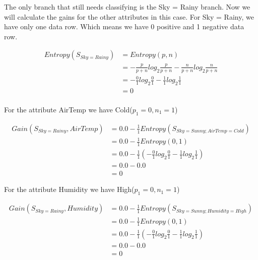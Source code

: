 \documentclass[10pt,a4paper]{article}
\begin{document}
{{{{{{{{{{

The only branch that still needs classifying is the Sky = Rainy branch. Now we will calculate the gains for the other attributes in this case. For Sky = Rainy, we have only one data row. Which means we have 0 positive and 1 negative data row.

\begin{equation}
\begin{split}
Entropy(S_{Sky=Rainy}) &= Entropy(p,n) \\
                       &= -\frac{p}{p+n}log_2\frac{p}{p+n} - \frac{n}{p+n}log_2\frac{n}{p+n}  \\
                       &= -\frac{0}{1} log_2\frac{0}{1} -\frac{1}{1} log_2\frac{1}{1} \\
                       &= 0   \\
\end{split}
\end{equation}

For the attribute AirTemp we have Cold($p_1=0,n_1=1$)
 
\begin{equation}
\begin{split}
Gain(S_{Sky=Rainy},AirTemp) &= 0.0 - \frac{1}{1} Entropy(S_{Sky=Sunny;AirTemp=Cold} )\\
          &= 0.0 - \frac{1}{1} Entropy(0,1) \\
          &= 0.0 - \frac{1}{1}( -\frac{0}{1} log_2\frac{0}{1} -\frac{1}{1} log_2\frac{1}{1} ) \\
          &= 0.0 - 0.0  \\
          &= 0
\end{split}
\end{equation}

For the attribute Humidity we have High($p_1=0,n_1=1$)
 
\begin{equation}
\begin{split}
Gain(S_{Sky=Rainy},Humidity) &= 0.0 - \frac{1}{1} Entropy(S_{Sky=Sunny;Humidity=High} )\\
          &= 0.0 - \frac{1}{1} Entropy(0,1) \\
          &= 0.0 - \frac{1}{1}( -\frac{0}{1} log_2\frac{0}{1} -\frac{1}{1} log_2\frac{1}{1} ) \\
          &= 0.0 - 0.0  \\
          &= 0
\end{split}
\end{equation}

}}}}}}}}}}
\end{document}
